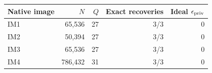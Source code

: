 \begin{center}
{\small
\setlength{\tabcolsep}{4pt}
\begin{tabular}{@{}lrrrr@{}}
\toprule
Native image & $N$ & $Q$ & Exact recoveries & Ideal $\epsilon_{\rm priv}$ \\
\midrule
IM1 & 65,536 & 27 & 3/3 & 0 \\
IM2 & 50,394 & 27 & 3/3 & 0 \\
IM3 & 65,536 & 27 & 3/3 & 0 \\
IM4 & 786,432 & 31 & 3/3 & 0 \\
\bottomrule
\end{tabular}}
\end{center}
